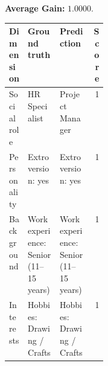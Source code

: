 \documentclass{ieeeaccess}
\begin{document}
\begin{multicols*}{2}
\noindent\begin{minipage}{\linewidth}
\noindent\textbf{Average Gain:} $1.0000$.\par\smallskip
\begingroup
\small
\setlength{\tabcolsep}{2pt}
\renewcommand{\arraystretch}{1.12}
\noindent\begin{tabularx}{\linewidth}{@{}p{0.19\linewidth}>{\raggedright\arraybackslash}X>{\raggedright\arraybackslash}Xr@{}}
\toprule
Dimension & Ground truth & Prediction & Score \\
\midrule
Social role & HR Specialist & Project Manager & 1 \\
\addlinespace[2pt]
Personality & Extroversion: yes & Extroversion: yes & 1 \\
\addlinespace[2pt]
Background & Work experience: Senior (11--15 years) & Work experience: Senior (11--15 years) & 1 \\
\addlinespace[2pt]
Interests & Hobbies: Drawing / Crafts & Hobbies: Drawing / Crafts & 1 \\
\bottomrule
\end{tabularx}\par
\endgroup
\end{minipage}\par\medskip


\end{multicols*}
\end{document}
